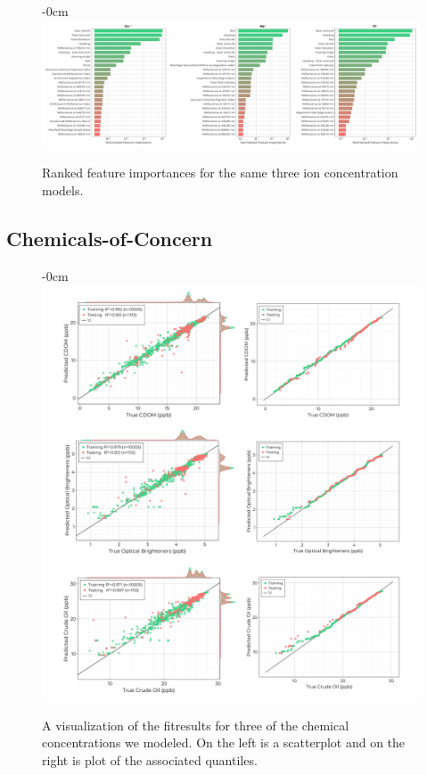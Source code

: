 \documentclass[journal,article,submit,pdftex,moreauthors]{Definitions/mdpi}
\begin{document}
\begin{figure}[H]
\begin{adjustwidth}{-\extralength}{0cm}
\centering
\includegraphics[width=18.0cm]{paper/figures/results/fits/ions-ranking.pdf}
\end{adjustwidth}
\caption{Ranked feature importances for the same three ion concentration models.\label{fig:ions-fit}}
\end{figure}  


\subsection{Chemicals-of-Concern}


\begin{figure}[H]
\begin{adjustwidth}{-\extralength}{0cm}
\centering
\includegraphics[width=16.0cm]{paper/figures/results/fits/chemical-fitres.pdf}
\end{adjustwidth}
\caption{A visualization of the fitresults for three of the chemical concentrations we modeled. On the left is a scatterplot and on the right is plot of the associated quantiles.\label{fig:chemicals-fit}}
\end{figure}  
\end{document}
